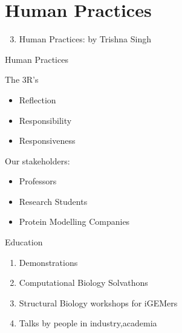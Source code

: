 \section*{Human Practices}

\begin{frame}
    \begin{enumerate}
        \setcounter{enumi}{2}
        \item Human Practices: by Trishna Singh
    \end{enumerate}
\end{frame}

\begin{frame}{Human Practices}
    \begin{block}{The 3R's}
        \begin{itemize}
            \item Reflection
            \item Responsibility
            \item Responsiveness
        \end{itemize}
    \end{block}

    Our stakeholders:
    \begin{itemize}
        \item Professors
        \item Research Students
        \item Protein Modelling Companies
    \end{itemize}
\end{frame}

\begin{frame}{Education}
    \begin{enumerate}
        \item Demonstrations
        \item Computational Biology Solvathons
        \item Structural Biology workshops for iGEMers
        \item Talks by people in industry,academia
    \end{enumerate}    
\end{frame}

